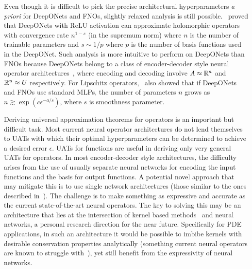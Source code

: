 Even though it is difficult to pick the precise architectural hyperparameters \emph{a priori} for DeepONets and FNOs, slightly relaxed analysis is still possible.~\citep{herrmann2024neural} proved that DeepONets with ReLU activation can approximate holomorphic operators with convergence rate $n^{1-s}$ (in the supremum norm) where $n$ is the number of trainable parameters and $s \sim 1/p$ where $p$ is the number of basis functions used in the DeepONet. Such analysis is more intuitive to perform on DeepONets than FNOs because DeepONets belong to a class of encoder-decoder style neural operator architectures~\citep{kovachki2024operator}, where encoding and decoding involve $A \approx \mathbb{R}^a$ and $\mathbb{R}^u \approx U$ respectively. For Lipschitz operators,~\citep{kovachki2024operator} also showed that if DeepONets and FNOs use standard MLPs, the number of parameters $n$ grows as $n \gtrsim \exp(c \epsilon^{-a/s})$, where $s$ is smoothness parameter.

Deriving universal approximation theorems for operators is an important but difficult task. Most current neural operator architectures do not lend themselves to UATs with which their optimal hyperparameters can be determined to achieve a desired error $\epsilon$. UATs for functions are useful in deriving only very general UATs for operators. In most encoder-decoder style architectures, the difficulty arises from the use of usually separate neural networks for encoding the input functions and the basis for output functions. A potential novel approach that may mitigate this is to use single network architectures (those similar to the ones described in~\citep{chen1995universal}). The challenge is to make something as expressive and accurate as the current state-of-the-art neural operators. The key to solving this may be an architecture that lies at the intersection of kernel based methods~\citep{batlle2024kernel} and neural networks, a personal research direction for the near future. Specifically for PDE applications, in such an architecture it would be possible to imbibe kernels with desirable conservation properties analytically (something current neural operators are known to struggle with~\citep{khorrami2024physics}), yet still benefit from the expressivity of neural networks.
%
\pagebreak
